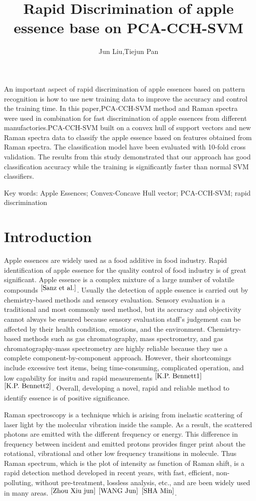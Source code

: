 \documentclass[a4paper]{article}
\date{} %
\title{Rapid Discrimination of apple essence base on PCA-CCH-SVM  }
\author{Jun Liu,Tiejun Pan}
\begin{document}
\maketitle

An important aspect of rapid discrimination of apple essences based on pattern recognition is how to use new training data to improve the accuracy and control the training time. In this paper,PCA-CCH-SVM method and Raman spectra were used in combination for fast discrimination of apple essences from different manufactories.PCA-CCH-SVM built on a convex hull of support vectors and new Raman spectra data to classify the apple essence based on features obtained from Raman spectra. The classification model have been evaluated with 10-fold cross validation. The results from this study demonstrated that our approach has good classiﬁcation accuracy while the training is signiﬁcantly faster than normal SVM classiﬁers.

Key words: Apple Essences; Convex-Concave Hull vector; PCA-CCH-SVM; rapid discrimination

\section{Introduction}
Apple essences are widely used as a food additive in food industry. Rapid identification of apple essence for the quality control of food industry is of great significant. Apple essence is a complex mixture of a large number of volatile compounds $^{\cite{Sanz et al.}}$. Usually the detection of apple essence is carried out by chemistry-based methods and sensory evaluation. Sensory evaluation is a traditional and most commonly used method, but its accuracy and objectivity cannot always be ensured because sensory evaluation staff’s judgement can be affected by their health condition, emotions, and the environment. Chemistry-based methods such as gas chromatography,  mass spectrometry, and gas chromatography-mass spectrometry are highly reliable because they use a complete component-by-component approach. However, their shortcomings include excessive test items, being time-consuming, complicated operation, and low capability for insitu and rapid measurements $^{\cite{K.P. Bennett1}}$ $^{\cite{K.P. Bennett2}}$. Overall, developing a novel, rapid and reliable method to identify  essence is of positive significance.

Raman spectroscopy is a technique which is arising from inelastic scattering of laser light by the molecular vibration inside the sample. As a result, the scattered photons are emitted with the different frequency or energy. This difference in frequency between incident and emitted protons provides finger print about the rotational, vibrational and other low frequency transitions in molecule. Thus Raman spectrum, which is the plot of intensity as function of Raman shift, is a rapid detection method developed in recent years, with fast, efficient, non-polluting, without pre-treatment, lossless analysis, etc., and are been widely used in many areas. $^{\cite{Zhou Xiu jun}}$
$^{\cite{WANG Jun}}$ $^{\cite{SHA Min}}$.
\end{document}
